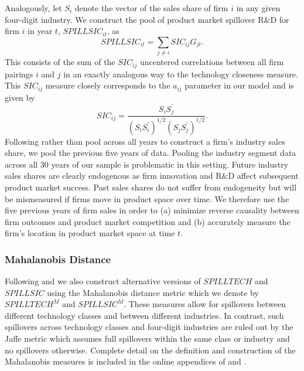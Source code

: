 \documentclass[12pt]{article}
\begin{document}
Analogously, let $S_i$ denote the vector of the sales share of firm $i$ in any given four-digit industry. We construct the pool of product market spillover R\&D for firm $i$ in year $t$, $\mathit{SPILLSIC}_{it}$, as
\begin{equation}
\mathit{SPILLSIC}_{it} = \sum_{j \neq i} \mathit{SIC}_{ij} G_{jt}.
\end{equation}
This consists of the sum of the $\mathit{SIC}_{ij}$ uncentered correlations between all firm pairings $i$ and $j$ in an exactly analogous way to the technology closeness measure. This $\mathit{SIC}_{ij}$ measure closely corresponds to the $a_{ij}$ parameter in our model and is given by
\begin{equation}
\mathit{SIC}_{ij} = \frac{S_{i} S^{'}_{j}}{(S_{i} S^{'}_{i})^{1/2} (S_{j} S^{'}_{j})^{1/2}}.
\end{equation}
Following \cite{lucking2018spillovers} rather than pool across all years to construct a firm's industry sales share, we pool the previous five years of data. Pooling the industry segment data across all 30 years of our sample is problematic in this setting. Future industry sales shares are clearly endogenous as firm innovation and R\&D affect subsequent product market success. Past sales shares do not suffer from endogeneity but will be mismeasured if firms move in product space over time. We therefore use the five previous years of firm sales in order to (a) minimize reverse causality between firm outcomes and product market competition and (b) accurately measure the firm’s location in product market space at time $t$.


\subsubsection{Mahalanobis Distance}

Following \cite{bloom2013} and \cite{lucking2018spillovers} we also construct alternative versions of $\mathit{SPILLTECH}$ and $\mathit{SPILLSIC}$ using
the Mahalanobis distance metric which we denote by $\mathit{SPILLTECH}^{M}$ and $\mathit{SPILLSIC}^{M}$. These measures allow for spillovers between different technology classes and between different industries. In contrast, such spillovers across technology classes and four-digit industries are ruled out by the Jaffe metric which assumes full spillovers within the same class or industry and no spillovers otherwise. Complete detail on the definition and construction of the Mahalanobis measures is included in the online appendices of \cite{bloom2013} and \cite{lucking2018spillovers}. 
\end{document}

